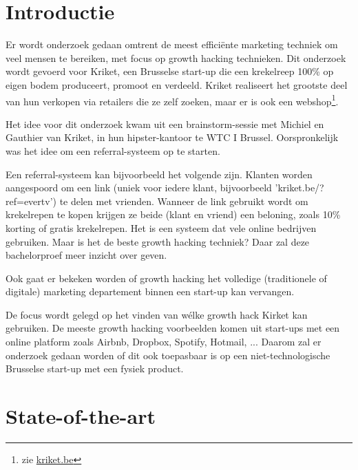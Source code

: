 
\section{Introductie} %
\label{sec:introductie}

Er wordt onderzoek gedaan omtrent de meest efficiënte marketing techniek om veel mensen te bereiken, met focus op growth hacking technieken. Dit onderzoek wordt gevoerd voor Kriket, een Brusselse start-up die een krekelreep 100\% op eigen bodem produceert, promoot en verdeeld. Kriket realiseert het grootste deel van hun verkopen via retailers die ze zelf zoeken, maar er is ook een webshop\footnote{zie \href{https://kriket.be}{kriket.be}}.

Het idee voor dit onderzoek kwam uit een brainstorm-sessie met Michiel en Gauthier van Kriket, in hun hipster-kantoor te WTC I Brussel. Oorspronkelijk was het idee om een referral-systeem op te starten. 

Een referral-systeem kan bijvoorbeeld het volgende zijn. Klanten worden aangespoord om een link (uniek voor iedere klant, bijvoorbeeld 'kriket.be/?ref=evertv') te delen met vrienden. Wanneer de link gebruikt wordt om krekelrepen te kopen krijgen ze beide (klant en vriend) een beloning, zoals 10\% korting of gratis krekelrepen. Het is een systeem dat vele online bedrijven gebruiken. Maar is het de beste growth hacking techniek? Daar zal deze bachelorproef meer inzicht over geven.

Ook gaat er bekeken worden of growth hacking het volledige (traditionele of digitale) marketing departement binnen een start-up kan vervangen.

De focus wordt gelegd op het vinden van wélke growth hack Kirket kan gebruiken. De meeste growth hacking voorbeelden komen uit start-ups met een online platform zoals Airbnb, Dropbox, Spotify, Hotmail, ... Daarom zal er onderzoek gedaan worden of dit ook toepasbaar is op een niet-technologische Brusselse start-up met een fysiek product.


\section{State-of-the-art}
\label{sec:state-of-the-art}


